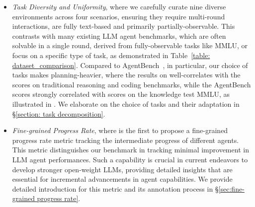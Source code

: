 \begin{itemize}[before=\vspace{-1mm}, leftmargin=10pt]
    \item \textit{Task Diversity and Uniformity}, 
    where we carefully curate nine diverse environments across four scenarios, ensuring they require multi-round interactions, are fully text-based and primarily partially-observable. This contrasts with many existing LLM agent benchmarks, which are often solvable in a single round, derived from fully-observable tasks like MMLU, or focus on a specific type of task, as demonstrated in Table~\ref{table: dataset_comparison}. 
    Compared to AgentBench~\citep{liu2023agentbench}, in particular, our choice of tasks makes \BenchName{} planning-heavier, where the results on \BenchName{} well-correlates with the scores on traditional reasoning and coding benchmarks, while the AgentBench scores strongly correlated with scores on the knowledge test MMLU, as illustrated in
    \citet{ruan2024observational}. 
    We elaborate on the choice of tasks and their adaptation in \S\ref{section: task decomposition}.
    
    \item \textit{Fine-grained Progress Rate}, where \BenchName{} is the first to propose a fine-grained progress rate metric tracking the intermediate progress of different agents. This metric distinguishes our benchmark in tracking minimal improvement in LLM agent performances. Such a capability is crucial in current endeavors to develop stronger open-weight LLMs, providing detailed insights that are essential for incremental advancements in agent capabilities. We provide detailed introduction for this metric and its annotation process in \S\ref{sec:fine-grained progress rate}.
    

\end{itemize}
